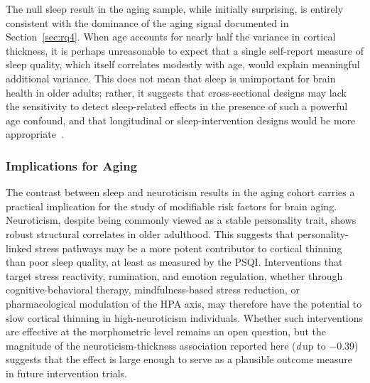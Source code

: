 The null sleep result in the aging sample, while initially surprising, is entirely consistent with the dominance of the aging signal documented in Section~\ref{sec:rq4}.
When age accounts for nearly half the variance in cortical thickness, it is perhaps unreasonable to expect that a single self-report measure of sleep quality, which itself correlates modestly with age, would explain meaningful additional variance.
This does not mean that sleep is unimportant for brain health in older adults; rather, it suggests that cross-sectional designs may lack the sensitivity to detect sleep-related effects in the presence of such a powerful age confound, and that longitudinal or sleep-intervention designs would be more appropriate~\cite{lim2013sleep, fjell2023poor}.

\subsubsection{Implications for Aging}

The contrast between sleep and neuroticism results in the aging cohort carries a practical implication for the study of modifiable risk factors for brain aging.
Neuroticism, despite being commonly viewed as a stable personality trait, shows robust structural correlates in older adulthood.
This suggests that personality-linked stress pathways may be a more potent contributor to cortical thinning than poor sleep quality, at least as measured by the PSQI.
Interventions that target stress reactivity, rumination, and emotion regulation, whether through cognitive-behavioral therapy, mindfulness-based stress reduction, or pharmacological modulation of the HPA axis, may therefore have the potential to slow cortical thinning in high-neuroticism individuals.
Whether such interventions are effective at the morphometric level remains an open question, but the magnitude of the neuroticism-thickness association reported here (\textit{d}\,up to $-$0.39) suggests that the effect is large enough to serve as a plausible outcome measure in future intervention trials.
